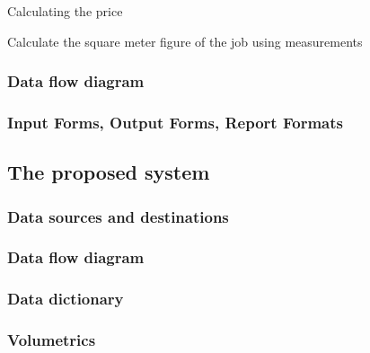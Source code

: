 \begin{algorithm}[H]
	\label{fig:algorithm_calculate_price}
		\caption{Calculating the price }
	\begin{algorithmic}[1]
			Calculate the square meter figure of the job using measurements \;
				
				
				
		\EndWhile

	\end{algorithmic}




\end{algorithm}





\subsubsection{Data flow diagram}

\subsubsection{Input Forms, Output Forms, Report Formats}

\subsection{The proposed system}

\subsubsection{Data sources and destinations}

\subsubsection{Data flow diagram}

\subsubsection{Data dictionary}

\subsubsection{Volumetrics}

